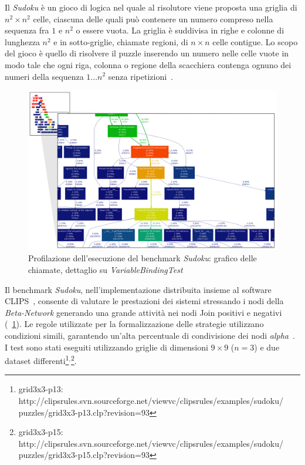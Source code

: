 Il \emph{Sudoku} è un gioco di logica nel quale al risolutore viene proposta una griglia di $n^2 \times n^2$ celle, ciascuna delle quali può contenere un numero compreso nella sequenza fra $1$ e $n^2$ o essere vuota. La griglia è suddivisa in righe e colonne di lunghezza $n^2$ e in sotto-griglie, chiamate regioni, di $n \times n$ celle contigue. Lo scopo del gioco è quello di risolvere il puzzle inserendo un numero nelle celle vuote in modo tale che ogni riga, colonna o regione della scacchiera contenga ognuno dei numeri della sequenza $1 \dots n^2$ senza ripetizioni~\cite{sudokuwikipedia}.

\begin{figure}
\centering
\includegraphics[width=1.3\textwidth, angle=270, viewport=0 0 718 456]{Immagini/Capitolo3/Profile-sudoku.pdf}
\caption[Profilazione dell'esecuzione del benchmark \emph{Sudoku}]{Profilazione dell'esecuzione del benchmark \emph{Sudoku}: grafico delle chiamate, dettaglio su \emph{VariableBindingTest}}\label{fig:profile-sudoku}
\end{figure}


Il benchmark \emph{Sudoku}, nell'implementazione distribuita insieme al software CLIPS~\cite{clipssudoku}, consente di valutare le prestazioni dei sistemi stressando i nodi della \emph{Beta-Network} generando una grande attività nei nodi Join positivi e negativi (\figurename~\ref{fig:profile-sudoku}). Le regole utilizzate per la formalizzazione delle strategie utilizzano condizioni simili, garantendo un'alta percentuale di condivisione dei nodi \emph{alpha}~\cite{rbsbench}. I test sono stati eseguiti utilizzando griglie di dimensioni $9 \times 9$ ($n = 3$) e due dataset differenti\footnote{grid3x3-p13: http://clipsrules.svn.sourceforge.net/viewvc/clipsrules/examples/sudoku/ puzzles/grid3x3-p13.clp?revision=93}$^,$\footnote{grid3x3-p15: http://clipsrules.svn.sourceforge.net/viewvc/clipsrules/examples/sudoku/ puzzles/grid3x3-p15.clp?revision=93}.

